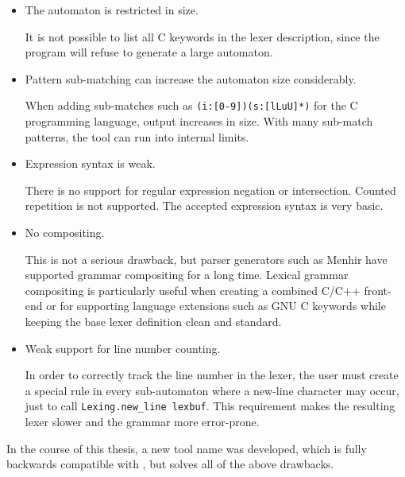 \begin{itemize}

   \item The automaton is restricted in size.

      It is not possible to list all C keywords in the lexer description, since
      the program will refuse to generate a large automaton.

   \item Pattern sub-matching can increase the automaton size considerably.

      When adding sub-matches such as \verb!(i:[0-9])(s:[lLuU]*)! for the C
      programming language, \ocamllex{} output increases in size. With many
      sub-match patterns, the tool can run into internal limits.

   \item Expression syntax is weak.

      There is no support for regular expression negation or intersection.
      Counted repetition is not supported. The accepted expression syntax is
      very basic.

   \item No compositing.

      This is not a serious drawback, but parser generators such as Menhir have
      supported grammar compositing for a long time. Lexical grammar compositing
      is particularly useful when creating a combined C/C++ front-end or for
      supporting language extensions such as GNU C keywords while keeping the
      base lexer definition clean and standard.

   \item Weak support for line number counting.

      In order to correctly track the line number in the lexer, the user must
      create a special rule in every sub-automaton where a new-line character
      may occur, just to call \texttt{Lexing.new\_line lexbuf}. This requirement
      makes the resulting lexer slower and the grammar more error-prone.

\end{itemize}

In the course of this thesis, a new tool name \reml{} was developed, which is
fully backwards compatible with \ocamllex{}, but solves all of the above
drawbacks.

